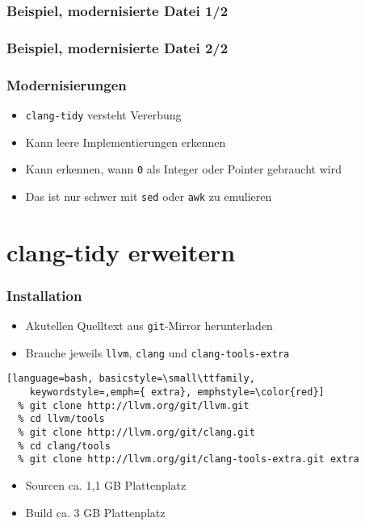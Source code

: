 \documentclass[aspectratio=169]{beamer}
\begin{document}
\begin{frame}[fragile]
  \frametitle{Beispiel, modernisierte Datei 1/2}
  
\end{frame}

\begin{frame}[fragile]
  \frametitle{Beispiel, modernisierte Datei 2/2}
  
\end{frame}

\begin{frame}
  \frametitle{Modernisierungen}
  \begin{itemize}
  \item \texttt{clang-tidy} versteht Vererbung
  \item Kann leere Implementierungen erkennen
  \item Kann erkennen, wann \texttt{0} als Integer oder Pointer gebraucht wird
  \item Das ist nur schwer mit \texttt{sed} oder \texttt{awk} zu emulieren 
  \end{itemize}
\end{frame}

\section{clang-tidy erweitern}

\begin{frame}[fragile]
  \frametitle{Installation}
  \begin{itemize}
  \item Akutellen Quelltext aus \texttt{git}-Mirror herunterladen
  \item Brauche jeweils \texttt{llvm},  \texttt{clang} und \texttt{clang-tools-extra} 
  \end{itemize}
  \begin{lstlisting}[language=bash, basicstyle=\small\ttfamily,
    keywordstyle=,emph={ extra}, emphstyle=\color{red}]
  % git clone http://llvm.org/git/llvm.git
  % cd llvm/tools
  % git clone http://llvm.org/git/clang.git
  % cd clang/tools
  % git clone http://llvm.org/git/clang-tools-extra.git extra
  \end{lstlisting}
  \begin{itemize}
  \item Sourcen ca. 1,1 GB Plattenplatz
  \item Build ca. 3 GB Plattenplatz
  \end{itemize}
\end{frame}
\end{document}

